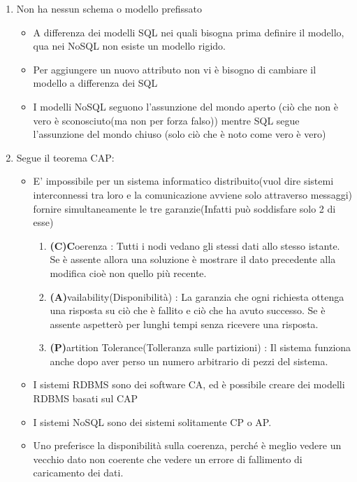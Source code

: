 \documentclass[a4page, 11pt]{article}
\begin{document}
\begin{enumerate}[noitemsep]
	 
	\item
	Non ha nessun schema o modello prefissato
	\begin{itemize}
		
		\item
		A differenza dei modelli SQL nei quali bisogna prima definire il
		modello, qua nei NoSQL non esiste un modello rigido.
		\item
		Per aggiungere un nuovo attributo non vi è bisogno di cambiare il
		modello a differenza dei SQL
		\item
		I modelli NoSQL seguono l'assunzione del mondo aperto (ciò che non è
		vero è sconosciuto(ma non per forza falso)) mentre SQL segue
		l'assunzione del mondo chiuso (solo ciò che è noto come vero è vero)
	\end{itemize}

	\def\labelenumi{\arabic{enumi}.}
	 
	\item
	Segue il teorema CAP:
	\begin{itemize}
		\item E' impossibile per un sistema informatico distribuito(vuol dire
		sistemi interconnessi tra loro e la comunicazione avviene solo
		attraverso messaggi) fornire simultaneamente le tre garanzie(Infatti può soddisfare solo 2 di esse)
		\begin{enumerate}		
			\item
			\textbf{(C)C}oerenza : Tutti i nodi vedano gli stessi dati allo
			stesso istante. Se è assente allora una soluzione è mostrare il dato
			precedente alla modifica cioè non quello più recente.
			\item
			\textbf{(A)}vailability(Disponibilità) : La garanzia che ogni richiesta ottenga
			una risposta su ciò che è fallito e ciò che ha avuto successo. Se è
			assente aspetterò per lunghi tempi senza ricevere una risposta.
			\item
			\textbf{(P)}artition Tolerance(Tolleranza sulle partizioni) : Il sistema funziona anche
			dopo aver perso un numero arbitrario di pezzi del sistema.
		\end{enumerate}
		\item
		I sistemi RDBMS sono dei software CA, ed è possibile creare dei
		modelli RDBMS basati sul CAP
		\item
		I sistemi NoSQL sono dei sistemi solitamente CP o AP.
		\item
		Uno preferisce la disponibilità sulla coerenza, perché è meglio vedere
		un vecchio dato non coerente che vedere un errore di fallimento di
		caricamento dei dati.
	\end{itemize}


\end{enumerate}
\end{document}
